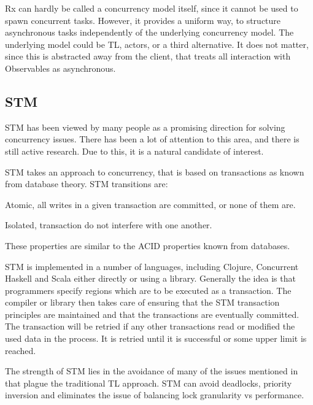 \ac{Rx} can hardly be called a concurrency model itself, since it cannot be used to spawn concurrent tasks. However, it provides a uniform way, to structure asynchronous tasks independently of the underlying concurrency model. The underlying model could be \ac{TL}, actors, or a third alternative. It does not matter, since this is abstracted away from the client, that treats all interaction with Observables as asynchronous.

\subsection{\acl{STM}}
\ac{STM} has been viewed by many people as a promising direction for solving concurrency issues\cite{sutter2005software}. There has been a lot of attention to this area, and there is still active research. Due to this, it is a natural candidate of interest.

\ac{STM} takes an approach to concurrency, that is based on transactions as known from database theory\cite[p. 1]{shavit1997software}. \ac{STM} transitions are:
\begin{inparaenum}[(1)]
\item Atomic, all writes in a given transaction are committed, or none of them are.
\item Isolated, transaction do not interfere with one another\cite{herlihy2011tm}.
\end{inparaenum} 
These properties are similar to the \ac{ACID} properties known from databases\cite[p. 754]{elmasri2011fundamentals}.

\ac{STM} is implemented in a number of languages, including Clojure\cite[p. 101]{sevenModels}, Concurrent Haskell\cite{harris2005composable} and Scala\cite{goodman2011muts} either directly or using a library. Generally the idea is that programmers specify regions which are to be executed as a transaction. The compiler or library then takes care of ensuring that the \ac{STM} transaction principles are maintained and that the transactions are eventually committed\cite[p. 1]{saha2006mcrt}. The transaction will be retried if any other transactions read or modified the used data in the process. It is retried until it is successful or some upper limit is reached.

The strength of \ac{STM} lies in the avoidance of many of the issues mentioned in  that plague the traditional \ac{TL} approach. \ac{STM} can avoid deadlocks, priority inversion and eliminates the issue of balancing lock granularity vs performance\cite[p. 1]{harris2005composable}.

